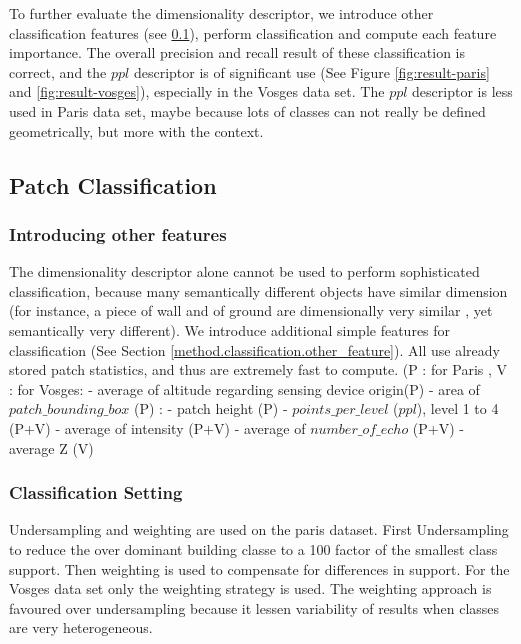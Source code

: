 		
		To further evaluate the dimensionality descriptor, we introduce other classification features (see \ref{result.classification}), perform classification and compute each feature importance.
		The overall precision and recall result of these classification is correct, and the $ppl$ descriptor is of significant use (See Figure \ref{fig:result-paris} and \ref{fig:result-vosges}), especially in the Vosges data set. The $ppl$ descriptor is less used in Paris data set, maybe because lots of classes can not really be defined geometrically, but more with the context.
		  
	\subsection{Patch Classification}
		\label{result.classification}
		 
		\subsubsection{Introducing other features}
		The dimensionality descriptor alone cannot be used to perform sophisticated classification,
		because many semantically different objects have similar dimension 
		(for instance, a piece of wall and of ground are dimensionally very similar
		, yet semantically very different).
		We introduce additional simple features for classification (See Section \ref{method.classification.other_feature}). All use already stored patch statistics, and thus are extremely fast to compute.
		(P : for Paris , V : for Vosges: 
		- average of altitude regarding sensing device origin(P)
		- area of $patch\_bounding\_box$ (P) : 
		- patch height (P)
		- $points\_per\_level$ ($ppl$), level 1 to 4 (P+V)
		- average of intensity (P+V)
		- average of $number\_of\_echo$ (P+V) 
		- average Z (V)
		
		\subsubsection{Classification Setting} 
		Undersampling and weighting are used on the paris dataset. First Undersampling to reduce the over dominant building classe to a 100 factor of the smallest class support. Then weighting is used to compensate for differences in support. 
		For the Vosges data set only the weighting strategy is used. 
		The weighting approach is favoured over undersampling because it lessen variability of results when classes are very heterogeneous.
		
